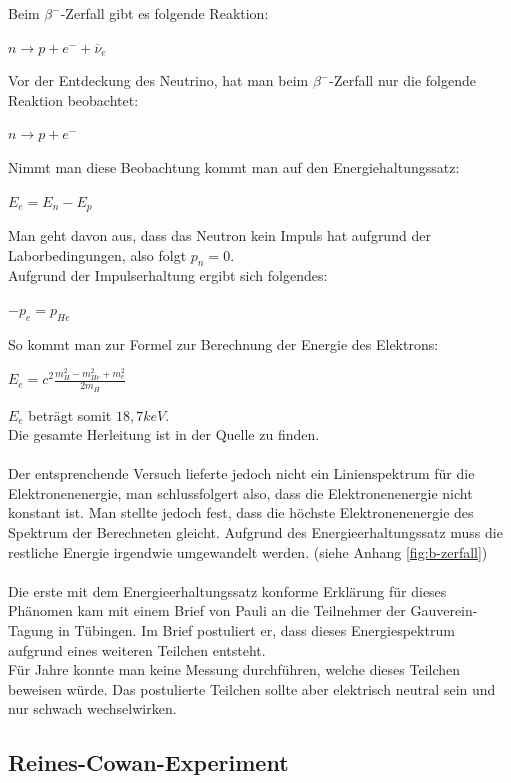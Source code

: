 Beim $\beta^{-}$-Zerfall gibt es folgende Reaktion:
\begin{center}
$n \rightarrow p + e^- + \overline{\nu}_e$
\end{center}
Vor der Entdeckung des Neutrino, hat man beim $\beta^{-}$-Zerfall nur die folgende Reaktion beobachtet:
\begin{center}
$n \rightarrow p + e^-$
\end{center}
Nimmt man diese Beobachtung kommt man auf den Energiehaltungssatz:
\begin{center}
$ E_e = E_n - E_p $
\end{center}
Man geht davon aus, dass das Neutron kein Impuls hat aufgrund der Laborbedingungen, also folgt
$p_n = 0$. \\
Aufgrund der Impulserhaltung ergibt sich folgendes:
\begin{center}
$ - p_e = p_{He} $
\end{center}
So kommt man zur Formel zur Berechnung der Energie des Elektrons:
\begin{center}
$ E_e = c^2 \frac{m_H^2 - m_{He}^2+m_e^2}{2m_H} $
\end{center}
$E_e$ beträgt somit $18,7 keV$. \\
Die gesamte Herleitung ist in der Quelle \cite{Horak2015} zu finden. \\ \\
Der entsprenchende Versuch lieferte jedoch nicht ein Linienspektrum für die Elektronenenergie,
man schlussfolgert also, dass die Elektronenenergie nicht konstant ist.
Man stellte jedoch fest, dass die höchste Elektronenenergie des Spektrum der Berechneten gleicht.
Aufgrund des Energieerhaltungssatz muss die restliche Energie irgendwie umgewandelt werden.
\cite{Horak2015} (siehe Anhang \ref{fig:b-zerfall}) \\ \\
Die erste mit dem Energieerhaltungssatz konforme Erklärung für dieses Phänomen kam mit einem Brief von
Pauli an die Teilnehmer der Gauverein-Tagung in Tübingen.
Im Brief postuliert er, dass dieses Energiespektrum aufgrund eines weiteren Teilchen
entsteht. \cite{Pauli1930} \\
Für Jahre konnte man keine Messung durchführen, welche dieses Teilchen beweisen würde.
Das postulierte Teilchen sollte aber elektrisch neutral sein und nur schwach wechselwirken.

\subsection{Reines-Cowan-Experiment}

